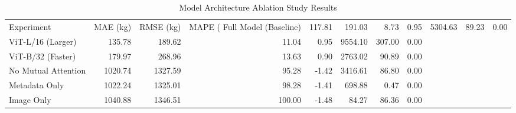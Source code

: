 \begin{table}[htbp]
\caption{Model Architecture Ablation Study Results}
\label{tab:ablation_results}
\begin{tabular}{lrrrrrrr}
\toprule
Experiment & MAE (kg) & RMSE (kg) & MAPE (%
\midrule
Full Model (Baseline) & 117.81 & 191.03 & 8.73 & 0.95 & 5304.63 & 89.23 & 0.00 \\
ViT-L/16 (Larger) & 135.78 & 189.62 & 11.04 & 0.95 & 9554.10 & 307.00 & 0.00 \\
ViT-B/32 (Faster) & 179.97 & 268.96 & 13.63 & 0.90 & 2763.02 & 90.89 & 0.00 \\
No Mutual Attention & 1020.74 & 1327.59 & 95.28 & -1.42 & 3416.61 & 86.80 & 0.00 \\
Metadata Only & 1022.24 & 1325.01 & 98.28 & -1.41 & 698.88 & 0.47 & 0.00 \\
Image Only & 1040.88 & 1346.51 & 100.00 & -1.48 & 84.27 & 86.36 & 0.00 \\
\bottomrule
\end{tabular}
\end{table}
